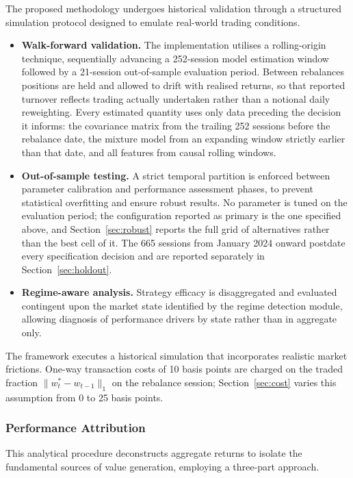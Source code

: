 The proposed methodology undergoes historical validation through a structured simulation
protocol designed to emulate real-world trading conditions.

\begin{itemize}
\item \textbf{Walk-forward validation.} The implementation utilises a rolling-origin
technique, sequentially advancing a 252-session model estimation window followed by a
21-session out-of-sample evaluation period. Between rebalances positions are held and
allowed to drift with realised returns, so that reported turnover reflects trading
actually undertaken rather than a notional daily reweighting. Every estimated quantity
uses only data preceding the decision it informs:
the covariance matrix from the trailing 252 sessions before the rebalance date, the
mixture model from an expanding window strictly earlier than that date, and all features
from causal rolling windows.
\item \textbf{Out-of-sample testing.} A strict temporal partition is enforced between
parameter calibration and performance assessment phases, to prevent statistical
overfitting and ensure robust results. No parameter is tuned on the evaluation period; the
configuration reported as primary is the one specified above, and
Section~\ref{sec:robust} reports the full grid of alternatives rather than the best cell
of it. The 665 sessions from January 2024 onward postdate every specification decision
and are reported separately in Section~\ref{sec:holdout}.
\item \textbf{Regime-aware analysis.} Strategy efficacy is disaggregated and evaluated
contingent upon the market state identified by the regime detection module, allowing
diagnosis of performance drivers by state rather than in aggregate only.
\end{itemize}

The framework executes a historical simulation that incorporates realistic market
frictions. One-way transaction costs of 10 basis points are charged on the traded
fraction $\|w^{\ast}_t - w_{t-1}\|_1$ on the rebalance session;
Section~\ref{sec:cost} varies this assumption from 0 to 25 basis points.

\subsubsection{Performance Attribution}

This analytical procedure deconstructs aggregate returns to isolate the fundamental
sources of value generation, employing a three-part approach.

